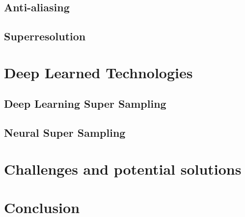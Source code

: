 \documentclass[10pt,twoside,english,a4paper]{article}
\begin{document}
\subsection{Anti-aliasing} \label{aasr:aa}

\subsection{Superresolution} \label{aasr:sr}

\section{Deep Learned Technologies} \label{deep}

\subsection{Deep Learning Super Sampling} \label{deep:dlss}

\subsection{Neural Super Sampling} \label{deep:neural}

\section{Challenges and potential solutions} \label{challenges}




\section{Conclusion} \label{conclusion}








\end{document}
